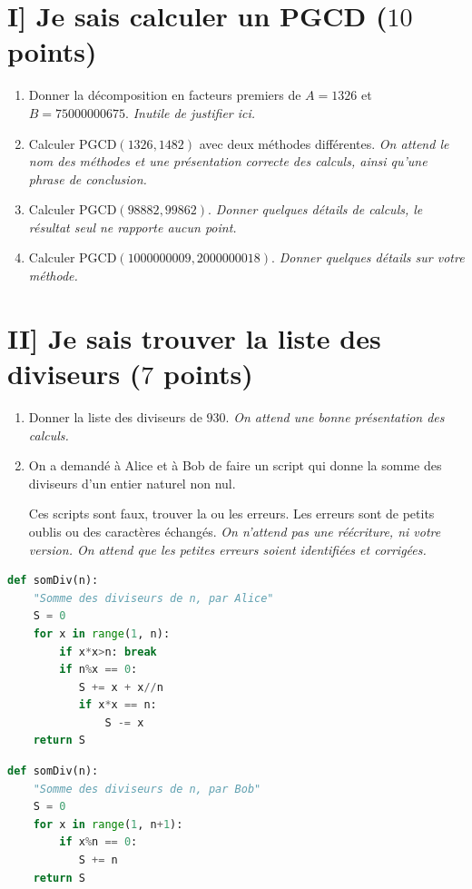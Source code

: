 \documentclass[12pt,a4paper]{article}
\begin{document}
\section*{I] Je sais calculer un PGCD ($10$ points)}
\begin{enumerate}
\item Donner la décomposition en facteurs premiers de $A = 1326$ et $B = 75000000675$. \emph{Inutile de justifier ici.}
\item Calculer $\textrm{PGCD}(1326, 1482)$ avec deux méthodes différentes. \emph{On attend le nom des méthodes et une présentation correcte des calculs, ainsi qu'une phrase de conclusion.}
\item Calculer $\textrm{PGCD}(\num{98882}, \num{99862})$. \emph{Donner quelques détails de calculs, le résultat seul ne rapporte aucun point.}
\item Calculer $\textrm{PGCD}(\num{1000000009}, \num{2000000018})$. \emph{Donner quelques détails sur votre méthode.}
\end{enumerate}


\section*{II] Je sais trouver la liste des diviseurs ($7$ points)}
\begin{enumerate}
\item Donner la liste des diviseurs de $930$. \emph{On attend une bonne présentation des calculs.}
\item On a demandé à Alice et à Bob de faire un script qui donne la somme des diviseurs d'un entier naturel non nul.

Ces scripts sont faux, trouver la ou les erreurs. Les erreurs sont de petits oublis ou des caractères échangés. \emph{On n'attend pas une réécriture, ni votre version. On attend que les petites erreurs soient identifiées et corrigées.}
\end{enumerate}

\lstset{frameround=fttt}

\begin{lstlisting}[language=Python, frame=trBL]
def somDiv(n):
    "Somme des diviseurs de n, par Alice"
    S = 0
    for x in range(1, n):
        if x*x>n: break
        if n%x == 0:
           S += x + x//n
           if x*x == n:
               S -= x
    return S
\end{lstlisting}

\begin{lstlisting}[language=Python, frame=trBL]
def somDiv(n):
    "Somme des diviseurs de n, par Bob"
    S = 0
    for x in range(1, n+1):
        if x%n == 0:
           S += n
    return S
\end{lstlisting}
\end{document}
